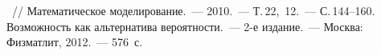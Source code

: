 \documentclass[twoside]{article}
\begin{document}
\begin{thebibliography}{1}
 ~// Математическое моделирование.~--- 2010.~--- Т.\,22, \No\,12.~---
С.\,144--160.
Возможность как альтернатива вероятности.~---
2-е издание.~---
Москва: Физматлит, 2012.~--- 576~с.
\end{thebibliography}
\end{document}
